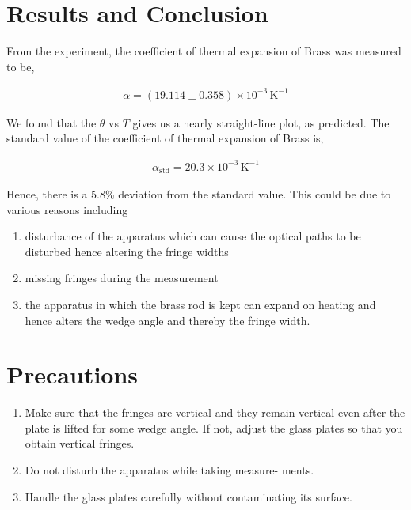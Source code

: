 \section{Results and Conclusion}

From the experiment, the coefficient of thermal expansion of Brass was measured to be,

\begin{align*}
    \alpha = (19.114 \pm 0.358) \times 10^{-3}\,\text{K}^{-1}
\end{align*}

We found that the $\theta$ vs $T$ gives us a nearly straight-line
plot, as predicted. The standard value of the coefficient of thermal expansion of Brass is,

\begin{align*}
    \alpha_\text{std} = 20.3 \times 10^{-3}\,\text{K}^{-1}
\end{align*}

Hence, there is a 5.8\% deviation from the standard value. This could be due to various reasons including 

\begin{enumerate}[label=(\roman*)]
    \item disturbance of the apparatus which can cause the
    optical paths to be disturbed hence altering the
    fringe widths
    \item missing fringes during the measurement
    \item the apparatus in which the brass rod is kept can
    expand on heating and hence alters the wedge angle
    and thereby the fringe width.
\end{enumerate}

\section{Precautions}

\begin{enumerate}
    \item Make sure that the fringes are vertical and they remain
    vertical even after the plate is lifted for some wedge angle.
    If not, adjust the glass plates so that you obtain
    vertical fringes.
    \item Do not disturb the apparatus while taking measure-
    ments.
    \item Handle the glass plates carefully without contaminating
    its surface.
\end{enumerate}
